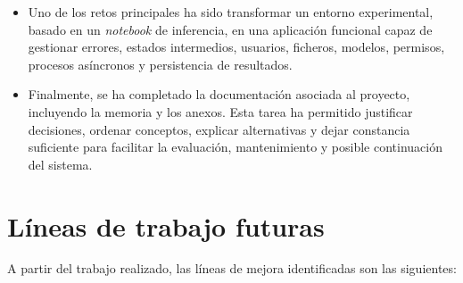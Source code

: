 \begin{itemize}
	\item Uno de los retos principales ha sido transformar un entorno experimental, basado en un \textit{notebook} de inferencia, en una aplicación funcional capaz de gestionar errores, estados intermedios, usuarios, ficheros, modelos, permisos, procesos asíncronos y persistencia de resultados.
	
	\item Finalmente, se ha completado la documentación asociada al proyecto, incluyendo la memoria y los anexos. Esta tarea ha permitido justificar decisiones, ordenar conceptos, explicar alternativas y dejar constancia suficiente para facilitar la evaluación, mantenimiento y posible continuación del sistema.
\end{itemize}

\section{Líneas de trabajo futuras}

A partir del trabajo realizado, las líneas de mejora identificadas son las siguientes:

